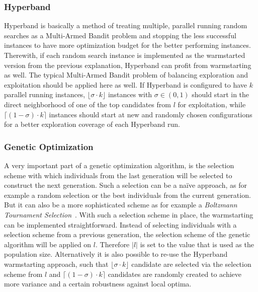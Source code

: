 \subsubsection{Hyperband}
Hyperband is basically a method of treating multiple, parallel running random searches as a Multi-Armed Bandit problem and stopping the less successful instances to have more optimization budget for the better performing instances.
Therewith, if each random search instance is implemented as the warmstarted version from the previous explanation, Hyperband can profit from warmstarting as well.\newline
The typical Multi-Armed Bandit problem of balancing exploration and exploitation should be applied here as well.
If Hyperband is configured to have $k$ parallel running instances, $\lfloor \sigma \cdot k \rfloor$ instances with $\sigma \in (0,1)$ should start in the direct neighborhood of one of the top candidates from $l$ for exploitation, while $\lceil (1 - \sigma) \cdot k \rceil$ instances should start at new and randomly chosen configurations for a better exploration coverage of each Hyperband run.

\subsubsection{Genetic Optimization}
A very important part of a genetic optimization algorithm, is the selection scheme with which individuals from the last generation will be selected to construct the next generation.
Such a selection can be a na\"ive approach, as for example a random selection or the best individuals from the current generation.
But it can also be a more sophisticated scheme as for example a \textit{Boltzmann Tournament Selection}~\cite{Goldberg-Boltzmann}.\newline
With such a selection scheme in place, the warmstarting can be implemented straightforward.
Instead of selecting individuals with a selection scheme from a previous generation, the selection scheme of the genetic algorithm will be applied on $l$.
Therefore $|l|$ is set to the value that is used as the population size.\newline
Alternatively it is also possible to re-use the Hyperband warmstarting approach, such that $\lfloor \sigma \cdot k \rfloor$ candidate are selected via the selection scheme from $l$ and $\lceil (1 - \sigma) \cdot k \rceil$ candidates are randomly created to achieve more variance and a certain robustness against local optima.

